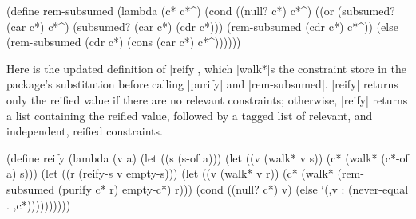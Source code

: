 \schemedisplayspace
\begin{schemedisplay}
(define rem-subsumed
  (lambda (c* c*^)
    (cond
      ((null? c*) c*^)
      ((or (subsumed? (car c*) c*^) (subsumed? (car c*) (cdr c*)))
       (rem-subsumed (cdr c*) c*^))
      (else (rem-subsumed (cdr c*) (cons (car c*) c*^))))))
\end{schemedisplay}

Here is the updated definition of \scheme|reify|, which
\scheme|walk*|s the constraint store in the package's substitution
before calling \scheme|purify| and \scheme|rem-subsumed|.
\scheme|reify| returns only the reified value if there are no relevant
constraints; otherwise, \scheme|reify| returns a list containing the
reified value, followed by a tagged list of relevant, and independent,
reified constraints.

\schemedisplayspace
\begin{schemedisplay}
(define reify
  (lambda (v a)
    (let ((s (s-of a)))
      (let ((v (walk* v s))
            (c* (walk* (c*-of a) s)))
        (let ((r (reify-s v empty-s)))
          (let ((v (walk* v r))
                (c* (walk* (rem-subsumed (purify c* r) empty-c*) r)))
            (cond
              ((null? c*) v)
              (else `(,v : (never-equal . ,c*))))))))))
\end{schemedisplay}


































